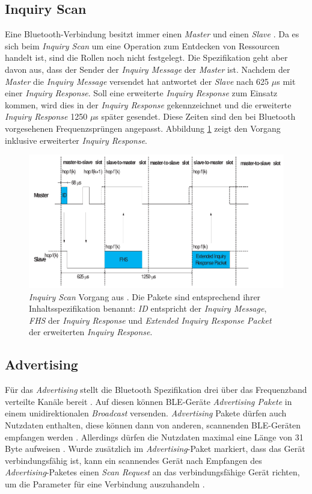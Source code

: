 \subsection{Inquiry Scan}
Eine Bluetooth-Verbindung besitzt immer einen \emph{Master} und einen \emph{Slave} \cite{blue2010inquiry}.
Da es sich beim \emph{Inquiry Scan} um eine Operation zum Entdecken von Ressourcen handelt ist, sind die Rollen noch nicht festgelegt. 
Die Spezifikation geht aber davon aus, dass der Sender der \emph{Inquiry Message} der \emph{Master} ist.
Nachdem der \emph{Master} die \emph{Inquiry Message} versendet hat antwortet der \emph{Slave} nach 625 $\mu$s mit einer \emph{Inquiry Response}. 
Soll eine erweiterte \emph{Inquiry Response} zum Einsatz kommen, wird dies in der \emph{Inquiry Response} gekennzeichnet und die erweiterte \emph{Inquiry Response} 1250 $\mu$s später gesendet.
Diese Zeiten sind den bei Bluetooth vorgesehenen Frequenzsprüngen angepasst.
Abbildung \ref{fig:inqscan} zeigt den Vorgang inklusive erweiterter \emph{Inquiry Response}.


\begin{figure}[h]
  \centering
	\includegraphics[width=\textwidth]{images/inqscan.png}
  \caption{\emph{Inquiry Scan} Vorgang aus \cite{blue2010inquiry}. Die Pakete sind entsprechend ihrer Inhaltsspezifikation benannt: \emph{ID} entspricht der \emph{Inquiry Message}, \emph{FHS} der \emph{Inquiry Response} und \emph{Extended Inquiry Response Packet} der erweiterten \emph{Inquiry Response}.}
  \label{fig:inqscan}
\end{figure}

\subsection{Advertising}
Für das \emph{Advertising} stellt die Bluetooth Spezifikation drei über das Frequenzband verteilte Kanäle bereit \cite{blue2010channel}.
Auf diesen können BLE-Geräte \emph{Advertising Pakete} in einem unidirektionalen \emph{Broadcast} versenden.
\emph{Advertising} Pakete dürfen auch Nutzdaten enthalten, diese können dann von anderen, scannenden BLE-Geräten empfangen werden \cite{blue2010advertising}.
Allerdings dürfen die Nutzdaten maximal eine Länge von 31 Byte aufweisen \cite{blue2010pdu}.
Wurde zusätzlich im \emph{Advertising}-Paket markiert, dass das Gerät verbindungsfähig ist, kann ein scannendes Gerät nach Empfangen des \emph{Advertising}-Paketes einen \emph{Scan Request} an das verbindungsfähige Gerät richten, um die Parameter für eine Verbindung auszuhandeln \cite{blue2010scanning}.

